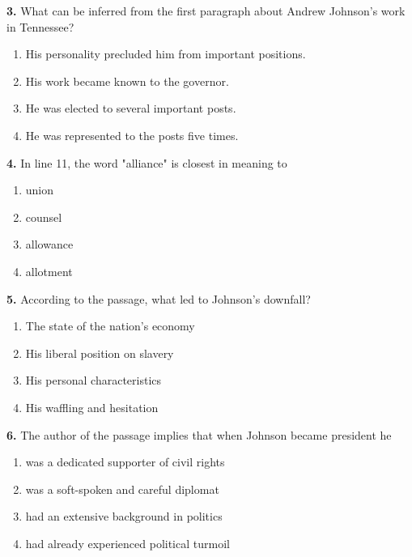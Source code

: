\documentclass[12pt]{article}
\begin{document}
\noindent\textbf{3.} What can be inferred from the first paragraph about Andrew Johnson's work in Tennessee?
\begin{enumerate}[label=(\Alph*),leftmargin=*,itemsep=0.2em]
\item His personality precluded him from important positions.
\item His work became known to the governor.
\item He was elected to several important posts.
\item He was represented to the posts five times.
\end{enumerate}
\par
\vspace{0.25\baselineskip}
\noindent\textbf{4.} In line 11, the word "alliance" is closest in meaning to
\begin{enumerate}[label=(\Alph*),leftmargin=*,itemsep=0.2em]
\item union
\item counsel
\item allowance
\item allotment
\end{enumerate}
\par
\vspace{0.25\baselineskip}
\noindent\textbf{5.} According to the passage, what led to Johnson's downfall?
\begin{enumerate}[label=(\Alph*),leftmargin=*,itemsep=0.2em]
\item The state of the nation's economy
\item His liberal position on slavery
\item His personal characteristics
\item His waffling and hesitation
\end{enumerate}
\par
\vspace{0.25\baselineskip}
\noindent\textbf{6.} The author of the passage implies that when Johnson became president he
\begin{enumerate}[label=(\Alph*),leftmargin=*,itemsep=0.2em]
\item was a dedicated supporter of civil rights
\item was a soft-spoken and careful diplomat
\item had an extensive background in politics
\item had already experienced political turmoil
\end{enumerate}
\par
\end{document}
